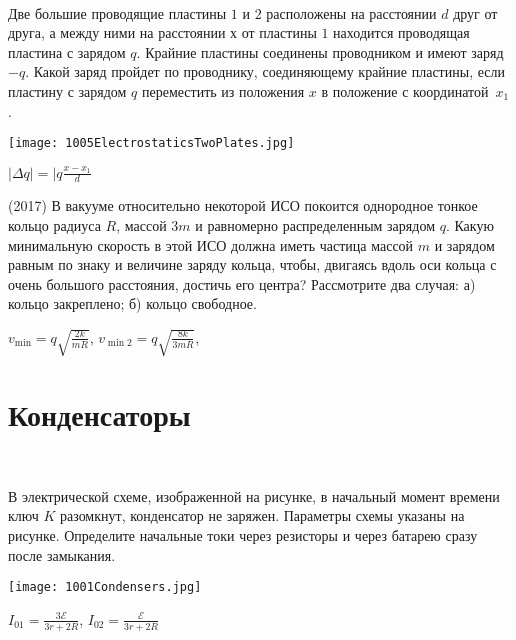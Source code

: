\begin{ex}
\hspace{0pt} \\
\begin{minipage}{.65\textwidth}
Две большие проводящие пластины $1$ и $2$ расположены на расстоянии $d$ друг от друга, 
а между ними на расстоянии $х$ от пластины $1$ находится проводящая пластина с зарядом $q$. 
Крайние пластины соединены проводником и имеют заряд $-q$. 
Какой заряд пройдет по проводнику, соединяющему крайние пластины, если пластину с зарядом $q$ переместить из положения $x$ в положение с координатой~$x_1$.
\end{minipage}
\begin{minipage}{.35\textwidth}
\centering
\texttt{[image: 1005ElectrostaticsTwoPlates.jpg]}
\end{minipage}
\begin{ans}
$\mid\Delta q \mid = \mid q \frac{x-x_1}{d}$
\end{ans}
\end{ex}

\begin{ex}
(2017) В вакууме относительно некоторой ИСО покоится однородное тонкое кольцо радиуса $R$, массой $3m$ и равномерно распределенным зарядом $q$. Какую минимальную скорость в этой ИСО должна иметь частица массой $m$ и зарядом равным по знаку и величине заряду кольца, чтобы, двигаясь вдоль оси кольца с очень большого расстояния, достичь его центра? Рассмотрите два случая: а) кольцо закреплено; б) кольцо свободное.

\begin{ans}
$v_{\min} = q\sqrt{\frac{2k}{mR}}$, $v_{\min 2} = q\sqrt{\frac{8k}{3mR}}$, 
\end{ans}
\end{ex}

\section{Конденсаторы}

\begin{ex}
\hspace{0pt} \\
\begin{minipage}{.65\textwidth}
В электрической схеме, изображенной на рисунке, в начальный момент времени ключ $K$ разомкнут, конденсатор не заряжен. 
Параметры схемы указаны на рисунке. Определите начальные токи через резисторы и через батарею сразу после замыкания.
\end{minipage}
\begin{minipage}{.35\textwidth}
\centering
\texttt{[image: 1001Condensers.jpg]}
\end{minipage}
\begin{ans}
$I_{01} = \frac{3 \mathcal{E}}{3r+2R}$, $I_{02} = \frac{\mathcal{E}}{3r+2R}$
\end{ans}
\end{ex}

